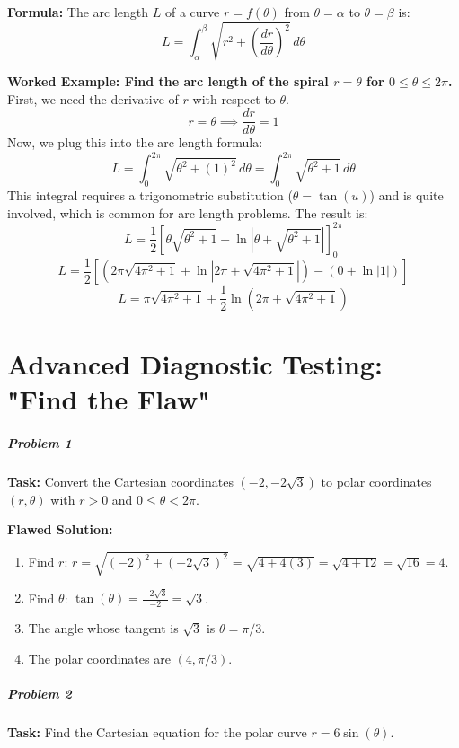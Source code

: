 \documentclass{article}
\begin{document}
\textbf{Formula:} The arc length \(L\) of a curve \(r = f(\theta)\) from \(\theta = \alpha\) to \(\theta = \beta\) is:
\[ L = \int_{\alpha}^{\beta} \sqrt{r^2 + \left(\frac{dr}{d\theta}\right)^2} \,d\theta \]

\textbf{Worked Example: Find the arc length of the spiral \(r = \theta\) for \(0 \le \theta \le 2\pi\).}
First, we need the derivative of \(r\) with respect to \(\theta\).
\[ r = \theta \implies \frac{dr}{d\theta} = 1 \]
Now, we plug this into the arc length formula:
\[ L = \int_{0}^{2\pi} \sqrt{\theta^2 + (1)^2} \,d\theta = \int_{0}^{2\pi} \sqrt{\theta^2 + 1} \,d\theta \]
This integral requires a trigonometric substitution (\(\theta = \tan(u)\)) and is quite involved, which is common for arc length problems. The result is:
\[ L = \frac{1}{2} \left[ \theta\sqrt{\theta^2+1} + \ln\left|\theta + \sqrt{\theta^2+1}\right| \right]_{0}^{2\pi} \]
\[ L = \frac{1}{2} \left[ (2\pi\sqrt{4\pi^2+1} + \ln|2\pi + \sqrt{4\pi^2+1}|) - (0 + \ln|1|) \right] \]
\[ L = \pi\sqrt{4\pi^2+1} + \frac{1}{2}\ln(2\pi + \sqrt{4\pi^2+1}) \]

\part{Advanced Diagnostic Testing: "Find the Flaw"}

\subsubsection*{Problem 1}
\textbf{Task:} Convert the Cartesian coordinates \((-2, -2\sqrt{3})\) to polar coordinates \((r, \theta)\) with \(r > 0\) and \(0 \le \theta < 2\pi\).

\textbf{Flawed Solution:}
\begin{enumerate}
    \item Find \(r\): \(r = \sqrt{(-2)^2 + (-2\sqrt{3})^2} = \sqrt{4 + 4(3)} = \sqrt{4 + 12} = \sqrt{16} = 4\).
    \item Find \(\theta\): \(\tan(\theta) = \frac{-2\sqrt{3}}{-2} = \sqrt{3}\).
    \item The angle whose tangent is \(\sqrt{3}\) is \(\theta = \pi/3\).
    \item The polar coordinates are \((4, \pi/3)\).
\end{enumerate}

\subsubsection*{Problem 2}
\textbf{Task:} Find the Cartesian equation for the polar curve \(r = 6\sin(\theta)\).
\end{document}
